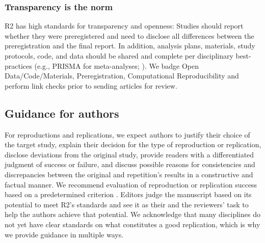 \documentclass[11pt,a4paper]{article}
\begin{document}
\subsubsection{Transparency is the norm}\label{transparency-is-the-norm}

R2 has high standards for transparency and openness: Studies should
report whether they were preregistered and need to disclose all
differences between the preregistration and the final report. In
addition, analysis plans, materials, study protocols, code, and data
should be shared and complete per disciplinary best-practices (e.g.,
PRISMA for meta-analyses; \autocite{Page2021PRISMA2020}). We badge Open
Data/Code/Materials, Preregistration, Computational Reproducibility and
perform link checks prior to sending articles for review.

\subsection{Guidance for authors}\label{guidance-for-authors}

For reproductions and replications, we expect authors to justify their
choice of the target study, explain their decision for the type of
reproduction or replication, disclose deviations from the original
study, provide readers with a differentiated judgment of success or
failure, and discuss possible reasons for consistencies and
discrepancies between the original and repetition's results in a
constructive and factual manner. We recommend evaluation of reproduction
or replication success based on a predetermined criterion
\autocite{Heyard2025ScopingReproducibilityMetrics}. Editors judge the
manuscript based on its potential to meet R2's standards and see it as
their and the reviewers' task to help the authors achieve that
potential. We acknowledge that many disciplines do not yet have clear
standards on what constitutes a good replication, which is why we
provide guidance in multiple ways.
\end{document}
